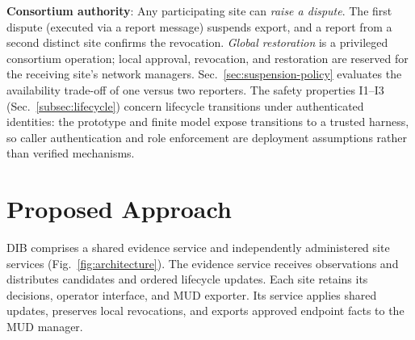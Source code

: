 \documentclass[journal]{IEEEtran}
\theoremstyle{definition}
\begin{document}

\textbf{Consortium authority}: Any participating site can \emph{raise a dispute}. The first dispute (executed via a report message) suspends export, and a report from a second distinct site confirms the revocation. \emph{Global restoration} is a privileged consortium operation; local approval, revocation, and restoration are reserved for the receiving site's network managers. Sec.~\ref{sec:suspension-policy} evaluates the availability trade-off of one versus two reporters. The safety properties I1--I3 (Sec.~\ref{subsec:lifecycle}) concern lifecycle transitions under authenticated identities: the prototype and finite model expose transitions to a trusted harness, so caller authentication and role enforcement are deployment assumptions rather than verified mechanisms.



\section{Proposed Approach}
\label{sec:design}
DIB comprises a shared evidence service and independently administered site services (Fig.~\ref{fig:architecture}). The evidence service receives observations and distributes candidates and ordered lifecycle updates. Each site retains its decisions, operator interface, and MUD exporter. Its service applies shared updates, preserves local revocations, and exports approved endpoint facts to the MUD manager.
\end{document}
